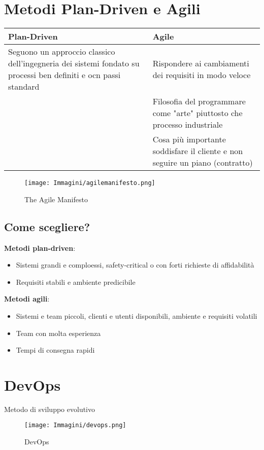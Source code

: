 \documentclass[12pt, a4paper]{report}
\begin{document}
\section{Metodi Plan-Driven e Agili}
\begin{center}
    \begin{tabular}{|p{}|p{}|}
        \hline
        \textbf{Plan-Driven} & \textbf{Agile} \\
        \hline
        Seguono un approccio classico dell'ingegneria dei sistemi fondato su processi ben definiti e ocn passi standard & Rispondere ai cambiamenti dei requisiti in modo veloce \\
        \hline
        & Filosofia del programmare come "arte" piuttosto che processo industriale \\
        \hline
        & Cosa più importante soddisfare il cliente e non seguire un piano (contratto)\\
        \hline
    \end{tabular}
\end{center}
\begin{figure}[h]
    \centering
    \texttt{[image: Immagini/agilemanifesto.png]}
    \caption{The Agile Manifesto}
\end{figure}
\subsection{Come scegliere?}
\textbf{Metodi plan-driven}: \begin{itemize}
    \item Sistemi grandi e comploessi, safety-critical o con forti richieste di affidabilità
    \item Requisiti stabili e ambiente predicibile
\end{itemize}
\textbf{Metodi agili}: \begin{itemize}
    \item Sistemi e team piccoli, clienti e utenti disponibili, ambiente e requisiti volatili
    \item Team con molta esperienza
    \item Tempi di consegna rapidi
\end{itemize}
\newpage
\section{DevOps}
Metodo di sviluppo evolutivo
\begin{figure}[h]
    \centering
    \texttt{[image: Immagini/devops.png]}
    \caption{DevOps}
\end{figure}
\end{document}
